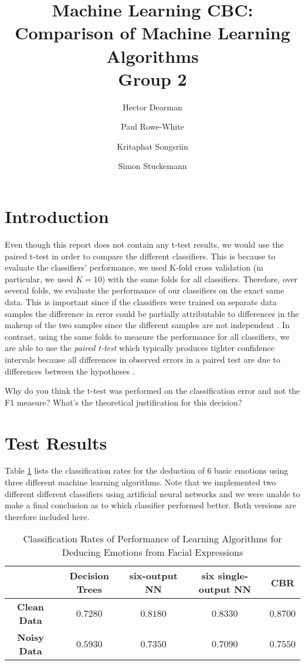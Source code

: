 \documentclass[10pt,a4paper]{article}
\author{Hector Dearman \and Paul Rowe-White \and Kritaphat Songsriin \and Simon Stuckemann}
\title{Machine Learning CBC: Comparison of Machine Learning Algorithms\\Group 2}
\begin{document}
\maketitle

\section{Introduction}
Even though this report does not contain any t-test results, we would use the paired t-test in order to compare the different classifiers. This is because to evaluate the classifiers' performance, we used K-fold cross validation (in particular, we used $K=10$) with the same folds for all classifiers. Therefore, over several folds, we evaluate the performance of our classifiers on the exact same data. This is important since if the classifiers were trained on separate data samples the difference in error could be partially attributable to differences in the makeup of the two samples since the different samples are not independent \cite{Mitchell:1997:ML:541177}. In contrast, using the same folds to measure the performance for all classifiers, we are able to use the \emph{paired t-test} which typically produces tighter confidence intervals because all differences in observed errors in a paired test are due to differences between the hypotheses \cite{Mitchell:1997:ML:541177}.

Why do you think the t-test was performed on the classification error and not the F1 measure? What's the theoretical justification for this decision?

\section{Test Results}
Table \ref{tab:classificationRates} lists the classification rates for the deduction of 6 basic emotions using three different machine learning algorithms. Note that we implemented two different different classifiers using artificial neural networks and we were unable to make a final conclusion as to which classifier performed better. Both versions are therefore included here.
\begin{table}[!ht]
\centering
\begin{tabular}{|c|c|c|c|c|}
\hline 
 & \textbf{Decision Trees} & \textbf{six-output NN} & \textbf{six single-output NN} & \textbf{CBR} \\ 
\hline 
\textbf{Clean Data} & $0.7280$ & $0.8180$ & $0.8330$ &  $0.8700$\\ 
\hline 
\textbf{Noisy Data} & $0.5930$ & $0.7350$ & $0.7090$ &  $0.7550$\\ 
\hline 
\end{tabular}
\caption{Classification Rates of Performance of Learning Algorithms for Deducing Emotions from Facial Expressions}
\label{tab:classificationRates}
\end{table}
\end{document}
